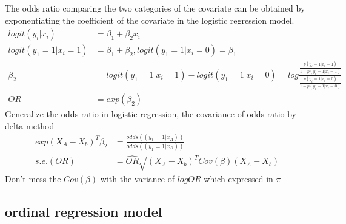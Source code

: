 \documentclass{article}
\begin{document}
The odds ratio comparing the two categories of the covariate can be obtained by exponentiating the coefficient of the covariate in the logistic regression model.
\begin{align*}
 logit(y_i|x_i) &= \beta_1 + \beta_2 x_i\\
 logit (y_1= 1| x_i= 1) &= \beta_1 + \beta_2,  logit (y_1= 1| x_i= 0) = \beta_1 \\
 \beta_2 &=  logit (y_1= 1| x_i= 1)  - logit (y_1= 1| x_i= 0) = log \frac{\frac{p(y_i=1|x_i=1)}{1-p(y_i=1|x_i=1)}}{\frac{p(y_i=1|x_i=0)}{1-p(y_i=1|x_i=0)}}\\
OR &= exp(\beta_2)
\end{align*}
Generalize the odds ratio in logistic regression, the covariance of odds ratio by delta method
\begin{align*}
exp (X_A - X_b)^T \beta_2 &=  \frac{odds ((y_1= 1| x_A))}{odds((y_1= 1| x_B))} \\
s.e.(OR) &= \hat{OR} \sqrt{(X_A - X_b)^T  Cov(\beta) (X_A - X_b)}
\end{align*}
Don't mess the $Cov(\beta)$ with the variance of $log OR$ which expressed in $\pi$

\subsection{ordinal regression model}
\end{document}
